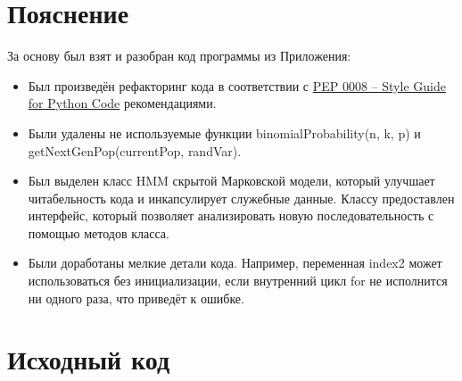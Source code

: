 \documentclass{article} %
\begin{document}
\section{Пояснение}
За основу был взят и разобран код программы из Приложения:
\begin{itemize}
	\item Был произведён рефакторинг кода в соответствии с \href{https://www.python.org/dev/peps/pep-0008/}{PEP 0008 -- Style Guide for Python Code} рекомендациями.
	\item Были удалены не используемые функции binomialProbability(n, k, p) и getNextGenPop(currentPop, randVar).
	\item Был выделен класс HMM скрытой Марковской модели, который улучшает читабельность кода и инкапсулирует служебные данные. Классу предоставлен интерфейс, который позволяет анализировать новую последовательность с помощью методов класса.
	\item Были доработаны мелкие детали кода. Например, переменная index2 может использоваться без инициализации, если внутренний цикл for не исполнится ни одного раза, что приведёт к ошибке.
\end{itemize}

\section{Исходный код}

\end{document}
